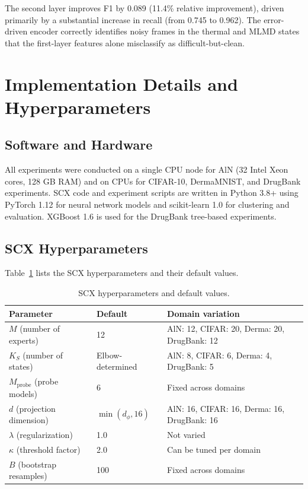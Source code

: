 \documentclass[11pt,a4paper]{article}
\begin{document}
The second layer improves F1 by 0.089 (11.4\% relative improvement), driven primarily by a substantial increase in recall (from 0.745 to 0.962). The error-driven encoder correctly identifies noisy frames in the thermal and MLMD states that the first-layer features alone misclassify as difficult-but-clean.

\section{Implementation Details and Hyperparameters}
\label{sec:S4}

\subsection{Software and Hardware}

All experiments were conducted on a single CPU node for AlN (32 Intel Xeon cores, 128 GB RAM) and on CPUs for CIFAR-10, DermaMNIST, and DrugBank experiments. SCX code and experiment scripts are written in Python 3.8+ using PyTorch 1.12 for neural network models and scikit-learn 1.0 for clustering and evaluation. XGBoost 1.6 is used for the DrugBank tree-based experiments.

\subsection{SCX Hyperparameters}

Table~\ref{tab:S4_hyperparams} lists the SCX hyperparameters and their default values.

\begin{table}[H]
\centering
\caption{SCX hyperparameters and default values.}
\label{tab:S4_hyperparams}
\begin{tabular}{lll}
\toprule
Parameter & Default & Domain variation \\
\midrule
$M$ (number of experts) & 12 & AlN: 12, CIFAR: 20, Derma: 20, DrugBank: 12 \\
$K_S$ (number of states) & Elbow-determined & AlN: 8, CIFAR: 6, Derma: 4, DrugBank: 5 \\
$M_{\text{probe}}$ (probe models) & 6 & Fixed across domains \\
$d$ (projection dimension) & $\min(d_\phi, 16)$ & AlN: 16, CIFAR: 16, Derma: 16, DrugBank: 16 \\
$\lambda$ (regularization) & 1.0 & Not varied \\
$\kappa$ (threshold factor) & 2.0 & Can be tuned per domain \\
$B$ (bootstrap resamples) & 100 & Fixed across domains \\
\bottomrule
\end{tabular}
\end{table}
\end{document}
